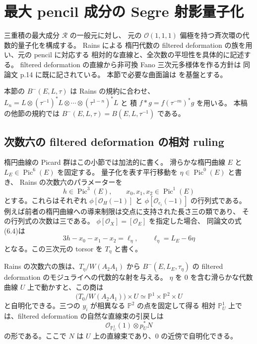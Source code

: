 \section{最大 pencil 成分の Segre 射影量子化}
\label{sec:native-pencil}

三重積の最大成分 $\mathcal R$ の一般元に対し、
元の $\mathcal O(1,1,1)$ 偏極を持つ斉次環の代数的量子化を構成する。
Rains \cite[命題5.1、第6節]{PencilRainsFiltered} による
楕円代数の filtered deformation の族を用い、元の pencil に対応する
相対的な直線と、全次数の平坦性を具体的に記述する。
filtered deformation の直線から非可換 Fano 三次元多様体を作る方針は
同論文 p.14 に既に記されている。
本節で必要な曲面論は \cite{PencilRainsBirational} を基盤とする。

本節の $B^{-}(E,L,\tau)$ は Rains の規約に合わせ、
$L_n=L\otimes(\tau^{-1})^*L\otimes\cdots\otimes(\tau^{1-n})^*L$ と
積 $f*g=f(\tau^{-m})^*g$ を用いる。
本稿の他節の規約では $B^{-}(E,L,\tau)=B(E,L,\tau^{-1})$ である。

\subsection{次数六の filtered deformation の相対 ruling}
\label{pencil:subsec:ruling}

楕円曲線の Picard 群はこの小節では加法的に書く。
滑らかな楕円曲線 $E$ と $L_E\in\operatorname{Pic}^6(E)$ を固定する。
量子化を表す平行移動を $\eta\in\operatorname{Pic}^0(E)$ と書き、
Rains \cite[\S6]{PencilRainsFiltered} の次数六のパラメーターを
\[
 h\in\operatorname{Pic}^3(E),\qquad
 x_0,x_1,x_2\in\operatorname{Pic}^1(E)
\]
とする。これらはそれぞれ $\phi[\mathcal O_H(-1)]$ と
$\phi[\mathcal O_{e_i}(-1)]$ の行列式である。
例えば前者の楕円曲線への導来制限は交点に支持された長さ三の類であり、
その行列式の次数は三である。
$\phi[\mathcal O_X]=[\mathcal O_E]$ を指定した場合、
同論文の式(6.4)は
\begin{equation}\label{pencil:eq:period-torsor}
 3h-x_0-x_1-x_2=\ell_\eta,
 \qquad \ell_\eta=L_E-6\eta
\end{equation}
となる。この三次元の torsor を $T_\eta$ と書く。

\begin{lemma}\label{pencil:lem:relative-ruling}
Rains の次数六の族は、$T_\eta/W(A_2A_1)$ から
$B^{-}(E,L_E,\tau_\eta)$ の filtered deformation のモジュライへの代数的な射を与える。
$\eta$ を $0$ を含む滑らかな代数曲線 $U$ 上で動かすと、この商は
\[
 \bigl(T_0/W(A_2A_1)\bigr)\times U
 \simeq\mathbb P^1\times\mathbb P^2\times U
\]
と自明化できる。三つの $y_i$ が相異なる $\mathbb P^2$ の点を固定して得る
相対 $\mathbb P^1_U$ 上では、filtered deformation の自然な直線束の引戻しは
\[
 \mathcal O_{\mathbb P^1_U}(1)\otimes p_U^*N
\]
の形である。ここで $N$ は $U$ 上の直線束であり、$0$ の近傍で自明化できる。
\end{lemma}

